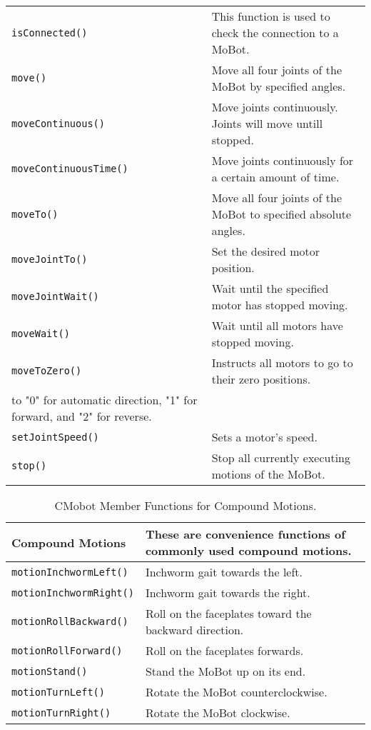 \begin{table}[!hp]
\begin{center}
\begin{tabular}{p{38 mm}p{77 mm}}
\texttt{isConnected()} & This function is used to check the connection to a MoBot. \\
\texttt{move()} & Move all four joints of the MoBot by specified angles. \\
\texttt{moveContinuous()} & Move joints continuously. Joints will move untill stopped.\\
\texttt{moveContinuousTime()} & Move joints continuously for a certain amount of time.\\
\texttt{moveTo()} & Move all four joints of the MoBot to specified absolute angles. \\
\texttt{moveJointTo()} & Set the desired motor position. \\
\texttt{moveJointWait()} & Wait until the specified motor has stopped moving. \\
\texttt{moveWait()} & Wait until all motors have stopped moving. \\
\texttt{moveToZero()} & Instructs all motors to go to their zero positions. \\
to "0" for automatic direction, "1" for forward, and "2" for reverse. \\
\texttt{setJointSpeed()} & Sets a motor's speed. \\
\texttt{stop()} & Stop all currently executing motions of the MoBot. \\
\hline
\end{tabular}
\end{center}
\label{mobilec_api_cbinary}
\end{table}

\begin{table}[!h]
\begin{center}
\caption{CMobot Member Functions for Compound Motions.}
\begin{tabular}{p{38 mm}p{77 mm}}
Compound Motions & These are convenience functions of commonly used compound motions. \\
\hline
\texttt{motionInchwormLeft()} \dotfill & Inchworm gait towards the left. \\
\texttt{motionInchwormRight()} \dotfill & Inchworm gait towards the right. \\
\texttt{motionRollBackward()} \dotfill & Roll on the faceplates toward the backward direction. \\
\texttt{motionRollForward()} \dotfill & Roll on the faceplates forwards. \\
\texttt{motionStand()} \dotfill & Stand the MoBot up on its end. \\
\texttt{motionTurnLeft()} \dotfill & Rotate the MoBot counterclockwise. \\
\texttt{motionTurnRight()} \dotfill & Rotate the MoBot clockwise. \\
\hline
\end{tabular}
\end{center}
\label{mobilec_api_compound}
\end{table}

